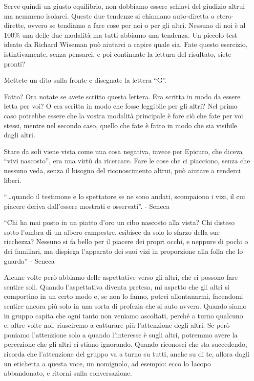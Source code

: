 \documentclass[12pt]{book} %
\begin{document}
Serve quindi un giusto equilibrio, non dobbiamo essere schiavi del giudizio altrui ma nemmeno isolarci. Queste due
tendenze si chiamano auto-diretta o etero-dirette, ovvero se tendiamo a fare cose per noi o per gli altri. Nessuno di
noi è al 100\% una delle due modalità ma tutti abbiamo una tendenza. Un piccolo test ideato da Richard Wiseman può
aiutarci a capire quale sia. Fate questo esercizio, istintivamente, senza pensarci, e poi continuate
la lettura del risultato, siete pronti?

Mettete un dito sulla fronte e disegnate la lettera “G”.

Fatto? Ora notate se avete scritto questa lettera. Era scritta in modo da essere letta per voi? O era scritta in modo che
fosse leggibile per gli altri? Nel primo caso potrebbe essere che la vostra modalità principale è fare ciò che fate per voi
stessi, mentre nel secondo caso, quello che fate è fatto in modo che sia visibile dagli altri.

Stare da soli viene vista come una cosa negativa, invece per Epicuro, che diceva “vivi nascosto”, era una virtù da
ricercare. Fare le cose che ci piacciono, senza che nessuno veda, senza il bisogno del riconoscimento altrui, può aiutare a renderci liberi.

“…quando il testimone e lo spettatore se ne sono andati, scompaiono i vizi, il cui piacere deriva dall’essere mostrati e osservati”. - Seneca

“Chi ha mai posto in un piatto d’oro un cibo nascosto alla vista? Chi disteso sotto l’ombra di un albero campestre, esibisce da solo lo sfarzo della sue ricchezza? Nessuno si fa bello per il piacere dei propri occhi, e neppure di pochi o dei familiari, ma dispiega l’apparato dei suoi vizi in proporzione alla folla che lo guarda” - Seneca

Alcune volte però abbiamo delle aspettative verso gli altri, che ci possono fare sentire soli. Quando
l'aspettativa diventa pretesa, mi aspetto che gli altri si comportino in un certo modo e, se non
lo fanno, potrei allontanarmi, facendomi sentire ancora più solo in una sorta di profezia che si auto avvera. Quando siamo
in gruppo capita che ogni tanto non veniamo ascoltati, perché a turno qualcuno e, altre volte noi, riusciremo a
catturare più l'attenzione degli altri. Se però poniamo l'attenzione solo a
quando l'interesse è sugli altri, potremmo avere la percezione che gli altri ci stiano ignorando. Quando
riconosci che sta succedendo, ricorda che l'attenzione del gruppo va a turno su tutti, anche su di
te, allora dagli un etichetta a questa voce, un nomignolo, ad esempio: ecco lo Iacopo abbandonato, e ritorni sulla
conversazione.
\end{document}
